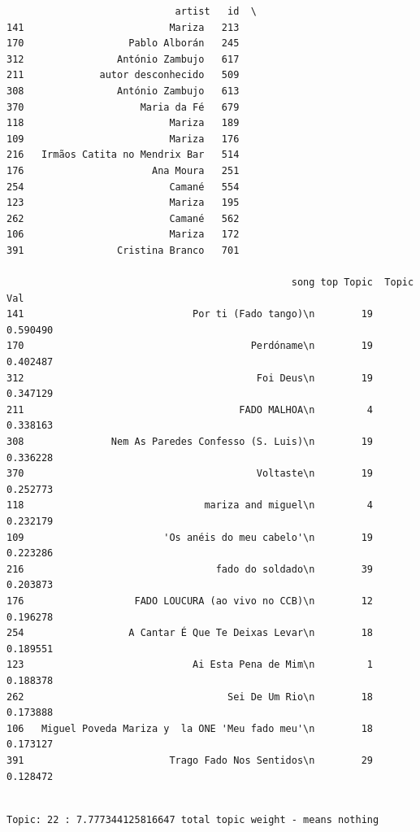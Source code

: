 \documentclass[11pt]{article}
\begin{document}
    
    \begin{verbatim}
                             artist   id  \
141                         Mariza   213   
170                  Pablo Alborán   245   
312                António Zambujo   617   
211             autor desconhecido   509   
308                António Zambujo   613   
370                    Maria da Fé   679   
118                         Mariza   189   
109                         Mariza   176   
216   Irmãos Catita no Mendrix Bar   514   
176                      Ana Moura   251   
254                         Camané   554   
123                         Mariza   195   
262                         Camané   562   
106                         Mariza   172   
391                Cristina Branco   701   

                                                 song top Topic  Topic Val  
141                             Por ti (Fado tango)\n        19   0.590490  
170                                       Perdóname\n        19   0.402487  
312                                        Foi Deus\n        19   0.347129  
211                                     FADO MALHOA\n         4   0.338163  
308               Nem As Paredes Confesso (S. Luis)\n        19   0.336228  
370                                        Voltaste\n        19   0.252773  
118                               mariza and miguel\n         4   0.232179  
109                        'Os anéis do meu cabelo'\n        19   0.223286  
216                                 fado do soldado\n        39   0.203873  
176                   FADO LOUCURA (ao vivo no CCB)\n        12   0.196278  
254                  A Cantar É Que Te Deixas Levar\n        18   0.189551  
123                             Ai Esta Pena de Mim\n         1   0.188378  
262                                   Sei De Um Rio\n        18   0.173888  
106   Miguel Poveda Mariza y  la ONE 'Meu fado meu'\n        18   0.173127  
391                         Trago Fado Nos Sentidos\n        29   0.128472  
    \end{verbatim}

    
    \begin{Verbatim}[commandchars=\\\{\}]

Topic: 22 : 7.777344125816647 total topic weight - means nothing

    \end{Verbatim}
\end{document}
